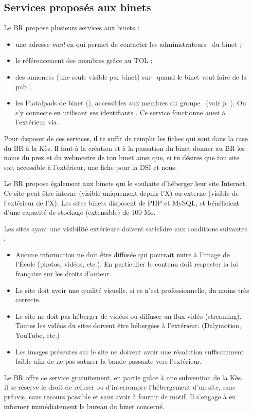 \subsection{Services propos\'es aux binets}

Le BR propose plusieurs services aux binets :
\begin{itemize}
\item une adresse \emph{mail} en  qui permet de contacter les administrateurs \fkz\ du binet ;
\item le référencement des membres grâce au TOL ;
\item des annonces (une seule visible par binet) sur \fkz\ quand le binet veut faire de la pub ;
\item les Platalpads de binet (), accessibles aux membres du groupe \fkz\ (voir p. \pageref{platalpad}).
On s'y connecte en utilisant ses identifiants \fkz. Ce service fonctionne aussi \`a l'ext\'erieur via
.
\end{itemize}

Pour disposer de ces services, il te suffit de remplir les fiches qui sont dans la case du BR à la Kès. Il faut à la création et à la passation du binet
donner au BR les noms du prez et du webmestre de ton binet ainsi que, si tu désires que ton site soit accessible à l'extérieur, une fiche pour la DSI et nous.

Le BR propose également aux binets qui le souhaite d'héberger leur site Internet. Ce site peut être interne (visible uniquement depuis l'X) ou externe (visible de l'extérieur de l'X).
Les sites binets disposent de PHP et MySQL, et bénéficient d'une capacité de stockage (extensible) de 100 Mo.

Les sites ayant une visibilité extérieure doivent satisfaire aux conditions suivantes :
\begin{itemize}
    \item Aucune information ne doit être diffusée qui pourrait nuire à l'image de l’École (photos, vidéos, etc.). En particulier le contenu doit respecter la loi française sur les droits d'auteur.
    \item Le site doit avoir une qualité visuelle, si ce n'est professionnelle, du moins très correcte.
    \item Le site ne doit pas héberger de vidéos ou diffuser un flux vidéo (streaming). Toutes les vidéos du sites doivent être hébergées à l'extérieur. (Dalymotion, YouTube, etc.)
    \item Les images présentes sur le site ne doivent avoir une résolution suffisamment faible afin de ne pas saturer la bande passante vers l'extérieur. 
\end{itemize}

Le BR offre ce service gratuitement, en partie grâce à une subvention de la Kès.
Il se réserve le droit de refuser ou d'interrompre l'hébergement d'un site, sans préavis, sans recours possible et sans avoir à fournir de motif.
Il s'engage à en informer immédiatement le bureau du binet concerné.